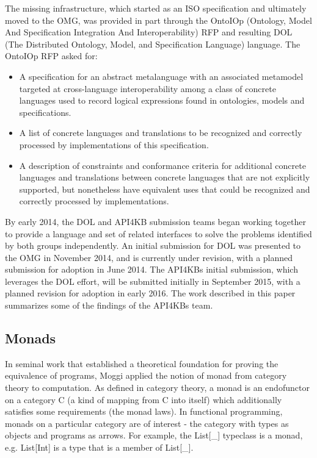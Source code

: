 \documentclass[runningheads]{llncs}
\begin{document}
The missing infrastructure, which started as an ISO specification and ultimately moved to the OMG, was provided in part through the OntoIOp (Ontology, Model And Specification Integration And Interoperability) RFP \cite{OntoIOp} and resulting DOL (The Distributed Ontology,
Model, and Specification
Language) language. The OntoIOp RFP asked for:
\begin {itemize}
\item A specification for an abstract metalanguage with an associated metamodel targeted at cross-language interoperability among a class of concrete languages used to record logical expressions found in ontologies, models and specifications.
\item A list of concrete languages and translations to be recognized and correctly processed by implementations of this specification. 
\item A description of constraints and conformance criteria for additional concrete languages and translations between concrete languages that are not explicitly supported, but nonetheless have equivalent uses that could be recognized and correctly processed by implementations.
\end{itemize}

By early 2014, the DOL and API4KB submission teams began working together to provide a language and set of related interfaces to solve the problems identified by both groups independently. An initial submission for DOL \cite{DOL} was presented to the OMG in November 2014, and is currently under revision, with a planned submission for adoption in June 2014.  The API4KBs initial submission, which leverages the DOL effort, will be submitted initially in September 2015, with a planned revision for adoption in early 2016.  The work described in this paper summarizes some of the findings of the API4KBs team.



\subsection{Monads}
In seminal work that established a theoretical foundation for proving the equivalence of programs, Moggi applied the notion of monad from category theory to computation.
As defined in category theory, a monad  is an endofunctor on a category C (a kind of mapping from C into itself) which additionally satisfies some requirements (the monad laws).
In functional programming, monads on a particular category are of interest - the category with types as objects and programs as arrows.
For example, the List[\_] typeclass is a monad, e.g. List[Int] is a type that is a member of List[\_].
\end{document}
